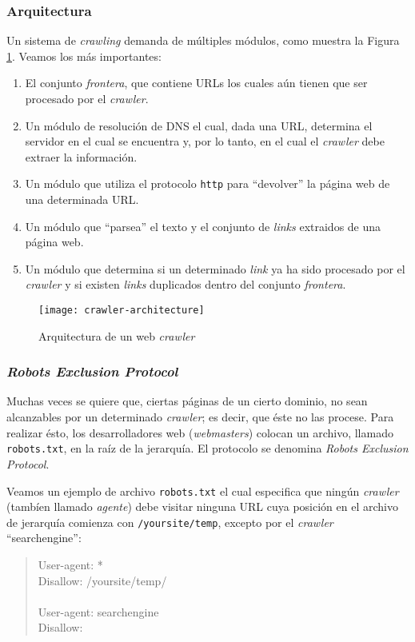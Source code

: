 		\subsubsection{Arquitectura}
			Un sistema de \textit{crawling} demanda de múltiples módulos, como muestra la Figura \ref{fig:crawler-architecture}. Veamos los más importantes:
			\begin{enumerate}
				\item El conjunto \textit{frontera}, que contiene URLs los cuales aún tienen que ser procesado por el \textit{crawler}.
				\item Un módulo de resolución de DNS el cual, dada una URL, determina el servidor en el cual se encuentra y, por lo tanto, en el cual el \textit{crawler} debe extraer la información.
				\item Un módulo que utiliza el protocolo \texttt{http} para \enquote{devolver} la página web de una determinada URL.
				\item Un módulo que \enquote{parsea} el texto y el conjunto de \textit{links} extraidos de una página web.
				\item Un módulo que determina si un determinado \textit{link} ya ha sido procesado por el \textit{crawler} y si existen \textit{links} duplicados dentro del conjunto \textit{frontera}.
			\end{enumerate}
			
			\begin{figure}[h]
				\texttt{[image: crawler-architecture]}
				\centering
				\caption{Arquitectura de un web \textit{crawler}}
				\label{fig:crawler-architecture}
			\end{figure}
			
		\subsubsection{\textit{Robots Exclusion Protocol}}
			Muchas veces se quiere que, ciertas páginas de un cierto dominio, no sean alcanzables por un determinado \textit{crawler}; es decir, que éste no las procese. Para realizar ésto, los desarrolladores web (\textit{webmasters}) colocan un archivo, llamado \texttt{robots.txt}, en la raíz de la jerarquía. El protocolo se denomina \textit{Robots Exclusion Protocol}. \par
			
			Veamos un ejemplo de archivo \texttt{robots.txt} el cual especifica que ningún \textit{crawler} (tambíen llamado \textit{agente}) debe visitar ninguna URL cuya posición en el archivo de jerarquía comienza con \texttt{/yoursite/temp}, excepto por el \textit{crawler} \enquote{searchengine}:
			\begin{quote}
				\begin{ttfamily}
					User-agent: * \\
					Disallow: /yoursite/temp/ \\ \\
					
					User-agent: searchengine \\
					Disallow:
				\end{ttfamily}
			\end{quote}
			
